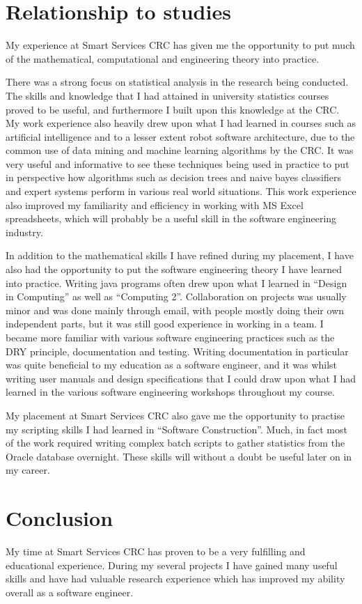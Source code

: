 \documentclass{report}
\begin{document}
\chapter{Relationship to studies}
My experience at Smart Services CRC has given me the opportunity to put much of the mathematical, computational and engineering theory into practice.

There was a strong focus on statistical analysis in the research being conducted. The skills and knowledge that I had attained in university statistics courses proved to be useful, and furthermore I built upon this knowledge at the CRC. My work experience also heavily drew upon what I had learned in courses such as artificial intelligence and to a lesser extent robot software architecture, due to the common use of data mining and machine learning algorithms by the CRC. It was very useful and informative to see these techniques being used in practice to put in perspective how algorithms such as decision trees and naive bayes classifiers and expert systems perform in various real world situations. This work experience also improved my familiarity and efficiency in working with MS Excel spreadsheets, which will probably be a useful skill in the software engineering industry.

In addition to the mathematical skills I have refined during my placement, I have also had the opportunity to put the software engineering theory I have learned into practice. Writing java programs often drew upon what I learned in ``Design in Computing'' as well as ``Computing 2''. Collaboration on projects was usually minor and was done mainly through email, with people mostly doing their own independent parts, but it was still good experience in working in a team. I became more familiar with various software engineering practices such as the DRY principle, documentation and testing. Writing documentation in particular was quite beneficial to my education as a software engineer, and it was whilst writing user manuals and design specifications that I could draw upon what I had learned in the various software engineering workshops throughout my course.

My placement at Smart Services CRC also gave me the opportunity to practise my scripting skills I had learned in ``Software Construction''. Much, in fact most of the work required writing complex batch scripts to gather statistics from the Oracle database overnight. These skills will without a doubt be useful later on in my career.


\chapter{Conclusion}
My time at Smart Services CRC has proven to be a very fulfilling and educational experience. During my several projects I have gained many useful skills and have had valuable research experience which has improved my ability overall as a software engineer.
\end{document}
